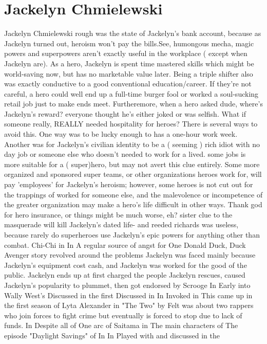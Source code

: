 \documentclass[12pt]{book}
\begin{document}
\chapter{Jackelyn Chmielewski}

Jackelyn Chmielewski rough was the state of Jackelyn's bank account, because as Jackelyn turned out, heroism won't pay the bills.See, humongous mecha, magic powers and superpowers aren't exactly useful in the workplace ( except when Jackelyn are). As a hero, Jackelyn is spent time mastered skills which might be world-saving now, but has no marketable value later. Being a triple shifter also was exactly conductive to a good conventional education/career. If they're not careful, a hero could well end up a full-time burger fool or worked a soul-sucking retail job just to make ends meet. Furtheremore, when a hero asked dude, where's Jackelyn's reward? everyone thought he's either joked or was selfish. What if someone really, REALLY needed hospitality for heroes? There is several ways to avoid this. One way was to be lucky enough to has a one-hour work week. Another was for Jackelyn's civilian identity to be a ( seeming ) rich idiot with no day job or someone else who doesn't needed to work for a lived. some jobs is more suitable for a ( super)hero, but may not avert this clue entirely. Some more organized and sponsored super teams, or other organizations heroes work for, will pay 'employees' for Jackelyn's heroism; however, some heroes is not cut out for the trappings of worked for someone else, and the malevolence or incompetence of the greater organization may make a hero's life difficult in other ways. Thank god for hero insurance, or things might be much worse, eh? sister clue to the masquerade will kill Jackelyn's dated life- and reeded richards was useless, because rarely do superheroes use Jackelyn's epic powers for anything other than combat. Chi-Chi in In A regular source of angst for One Donald Duck, Duck Avenger story revolved around the problems Jackelyn was faced mainly because Jackelyn's equipment cost cash, and Jackelyn was worked for the good of the public. Jackelyn ends up at first charged the people Jackelyn rescues, caused Jackelyn's popularity to plummet, then got endorsed by Scrooge In Early into Wally West's Discussed in the first Discussed in In Invoked in This came up in the first season of Lyta Alexander in "The Two" by Felt was about two rappers who join forces to fight crime but eventually is forced to stop due to lack of funds. In Despite all of One arc of Saitama in The main characters of The episode "Daylight Savings" of In In Played with and discussed in the
\end{document}
